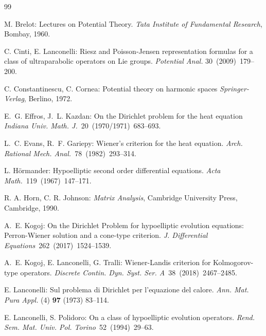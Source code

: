 \documentclass{amsart}
\numberwithin{equation}{section}
\def\vs{\vspace{1mm}}
\begin{document}
{\begin{thebibliography}{99}
                  
 {\sc M. Brelot}:
                Lectures on Potential Theory.
                {\it Tata Institute of Fundamental Research}, Bombay, 1960.
                 \vs
   
 {\sc C. Cinti, E. Lanconelli}:
                Riesz and Poisson-Jensen representation formulas for a class of ultraparabolic
               	operators on Lie groups.
                {\it Potential Anal.} 30~(2009)~179--200.
                \vs
   
 {\sc C. Constantinescu, C. Cornea}:
               Potential theory on harmonic spaces
               {\it Springer-Verlag}, Berlino, 1972.  
                \vs
             
 {\sc E.~\!G. Effros, J.~\!L. Kazdan}:
               On the Dirichlet problem for the heat equation
               {\it Indiana Univ. Math. J.}~20~(1970/1971)~683--693.
               \vs
   
 {\sc L.~\!C. Evans, R.~\!F. Gariepy}: 
               Wiener’s criterion for the heat equation.
               {\it Arch. Rational Mech. Anal.}~78~(1982)~293–314.
               \vs

 {\sc L. H{\"o}rmander}: 
                 Hypoelliptic second order differential equations.
                 {\it Acta Math.}~119~(1967)~147--171.
                  \vs
 
 {\sc R. A. Horn, C. R. Johnson}:  {\it Matrix Analysis}, Cambridge University Press, Cambridge, 1990.
\vs 

 {\sc A.~\!E. Kogoj}:
                 On the Dirichlet Problem for hypoelliptic evolution equations: Perron-Wiener solution and a cone-type criterion. 
                 {\it J. Differential Equations}~262~(2017)~1524--1539.
                 \vs
  
 {\sc A.~\!E. Kogoj, E. Lanconelli, G. Tralli}:
                  Wiener-Landis criterion for Kolmogorov-type operators.
                 {\it Discrete Contin. Dyn. Syst. Ser. A}~38~(2018)~2467--2485.
                  \vs
       
 {\sc E. Lanconelli}: Sul problema di Dirichlet per l'equazione del calore. {\it Ann. Mat. Pura Appl.} (4) {\bf 97} (1973) 83--114.
\vs
  
 {\sc E. Lanconelli, S. Polidoro}:
               On a class of hypoelliptic evolution operators.
               {\it Rend. Sem. Mat. Univ. Pol. Torino}~52~(1994)~29--63.
               \vs
   

\end{thebibliography}}
\end{document}

